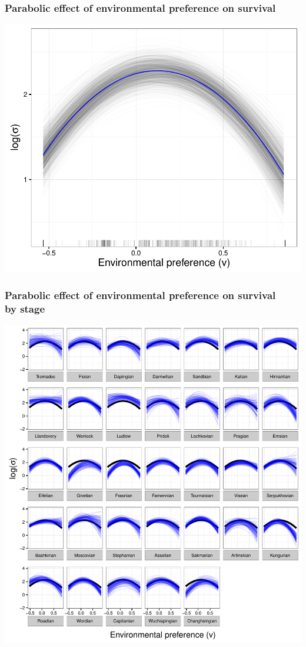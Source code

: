 \documentclass{beamer}
\begin{document}
\begin{frame}
  \frametitle{Parabolic effect of environmental preference on survival}
  \begin{center}
    \includegraphics[width=\textwidth,height=0.8\textheight,keepaspectratio=true]{figure/env_effect}
  \end{center}
\end{frame}

\begin{frame}
  \frametitle{Parabolic effect of environmental preference on survival \\by stage}
  \begin{center}
    \includegraphics[width=\textwidth,height=0.8\textheight,keepaspectratio=true]{figure/env_cohort}
  \end{center}
\end{frame}
\end{document}
